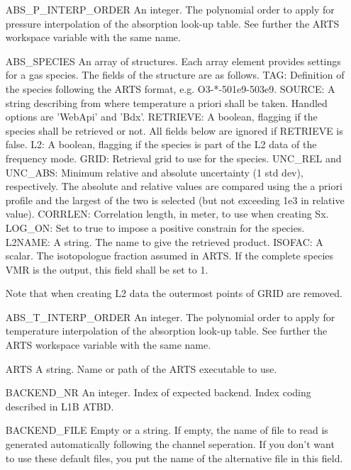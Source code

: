 \begin{changemargin}{2.5cm}{0.0cm} 

\begin{itemize}
\item[{ABS\_P\_INTERP\_ORDER}]
An integer. The polynomial order to apply for pressure interpolation of the
absorption look-up table. See further the ARTS workspace variable with the
same name.

\item[{ABS\_SPECIES}]
An array of structures. Each array element provides settings for a gas
species. The fields of the structure are as follows. TAG: Definition of the
species following the ARTS format, e.g. O3-*-501e9-503e9. SOURCE: A string
describing from where temperature a priori shall be taken. Handled options
are 'WebApi' and 'Bdx'. RETRIEVE: A boolean, flagging if the species shall
be retrieved or not. All fields below are ignored if RETRIEVE is false. L2: A
boolean, flagging if the species is part of the L2 data of the frequency mode.
GRID: Retrieval grid to use for the species. UNC\_REL and UNC\_ABS: Minimum
relative and absolute uncertainty (1 std dev), respectively. The absolute
and relative values are compared using the a priori profile and the largest
of the two is selected (but not exceeding 1e3 in relative value). CORRLEN:
Correlation length, in meter, to use when creating Sx. LOG\_ON: Set to true
to impose a positive constrain for the species. L2NAME: A string. The name
to give the retrieved product. ISOFAC: A scalar. The isotopologue fraction
assumed in ARTS. If the complete species VMR is the
output, this field shall be set to 1.

Note that when creating L2 data the outermost points of GRID are removed.

\item[{ABS\_T\_INTERP\_ORDER}]
An integer. The polynomial order to apply for temperature interpolation of the
absorption look-up table. See further the ARTS workspace variable with the
same name.

\item[{ARTS}]
A string. Name or path of the ARTS executable to use.

\item[{BACKEND\_NR}]
An integer. Index of expected backend. Index coding described in L1B ATBD.

\item[{BACKEND\_FILE}]
Empty or a string. If empty, the name of file to read is generated
automatically following the channel seperation. If you don't want to use
these default files, you put the name of the alternative file in this field.


\end{itemize}
\end{changemargin}
